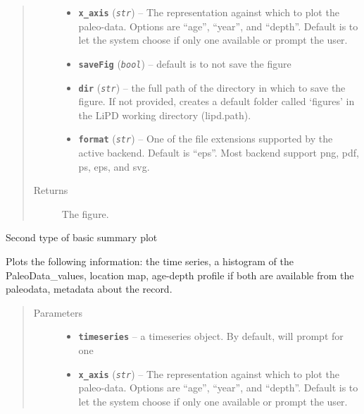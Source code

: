 \documentclass[letterpaper,10pt,english]{sphinxmanual}
\begin{document}
\begin{fulllineitems}
\begin{fulllineitems}
\begin{quote}
\begin{description}
\begin{itemize}
\item {} 
\textbf{\texttt{x\_axis}} (\emph{\texttt{str}}) -- The representation against which to plot the paleo-data.
Options are ``age'', ``year'', and ``depth''. Default is to let the
system choose if only one available or prompt the user.

\item {} 
\textbf{\texttt{saveFig}} (\emph{\texttt{bool}}) -- default is to not save the figure

\item {} 
\textbf{\texttt{dir}} (\emph{\texttt{str}}) -- the full path of the directory in which to save the figure.
If not provided, creates a default folder called `figures' in the
LiPD working directory (lipd.path).

\item {} 
\textbf{\texttt{format}} (\emph{\texttt{str}}) -- One of the file extensions supported by the active
backend. Default is ``eps''. Most backend support png, pdf, ps, eps,
and svg.

\end{itemize}

\item[{Returns}] \leavevmode
The figure.

\end{description}\end{quote}

\end{fulllineitems}


\begin{fulllineitems}
\label{SummaryPlots:pyleoclim.SummaryPlots.basic2}
Second type of basic summary plot

Plots the following information: the time series, a histogram of
the PaleoData\_values, location map, age-depth profile if both are
available from the paleodata, metadata about the record.
\begin{quote}\begin{description}
\item[{Parameters}] \leavevmode\begin{itemize}
\item {} 
\textbf{\texttt{timeseries}} -- a timeseries object. By default, will prompt for one

\item {} 
\textbf{\texttt{x\_axis}} (\emph{\texttt{str}}) -- The representation against which to plot the paleo-data.
Options are ``age'', ``year'', and ``depth''. Default is to let the
system choose if only one available or prompt the user.


\end{itemize}
\end{description}
\end{quote}
\end{fulllineitems}
\end{fulllineitems}
\end{document}
